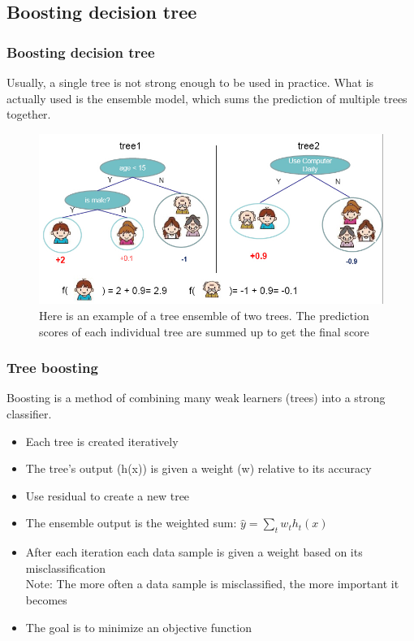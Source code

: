 \documentclass{beamer}
\begin{document}
\subsection{Boosting decision tree}
\begin{frame}
\frametitle{Boosting decision tree}
Usually, a single tree is not strong enough to be used in practice. What is actually used is the ensemble model, which sums the prediction of multiple trees together.
\begin{figure}
\includegraphics[scale=0.40]{./figures/boosting}
\caption{Here is an example of a tree ensemble of two trees. The prediction scores of each individual tree are summed up to get the final score}
\end{figure}
\end{frame}
\begin{frame}
\frametitle{Tree boosting}
Boosting is a method of combining many weak learners (trees) into a strong classifier.
\begin{itemize}
\item Each tree is created iteratively
\item The tree’s output (h(x)) is given a weight (w) relative to its accuracy
\item Use residual to create a new tree
\item The ensemble output is the weighted sum:  $\hat{y}=\sum_{t}w_{t} h_{t}(x)$
\item After each iteration each data sample is given a weight based on its misclassification\\
Note: The more often a data sample is misclassified, the more important it becomes 
\item The goal is to minimize an objective function
\end{itemize}
\end{frame}
\end{document}
